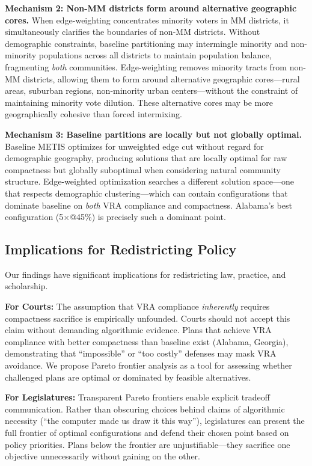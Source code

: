 \textbf{Mechanism 2: Non-MM districts form around alternative geographic cores.} When edge-weighting concentrates minority voters in MM districts, it simultaneously clarifies the boundaries of non-MM districts. Without demographic constraints, baseline partitioning may intermingle minority and non-minority populations across all districts to maintain population balance, fragmenting \emph{both} communities. Edge-weighting removes minority tracts from non-MM districts, allowing them to form around alternative geographic cores---rural areas, suburban regions, non-minority urban centers---without the constraint of maintaining minority vote dilution. These alternative cores may be more geographically cohesive than forced intermixing.

\textbf{Mechanism 3: Baseline partitions are locally but not globally optimal.} Baseline METIS optimizes for unweighted edge cut without regard for demographic geography, producing solutions that are locally optimal for raw compactness but globally suboptimal when considering natural community structure. Edge-weighted optimization searches a different solution space---one that respects demographic clustering---which can contain configurations that dominate baseline on \emph{both} VRA compliance and compactness. Alabama's best configuration (5$\times$@45\%) is precisely such a dominant point.

\subsection{Implications for Redistricting Policy}

Our findings have significant implications for redistricting law, practice, and scholarship.

\textbf{For Courts:} The assumption that VRA compliance \emph{inherently} requires compactness sacrifice is empirically unfounded. Courts should not accept this claim without demanding algorithmic evidence. Plans that achieve VRA compliance with better compactness than baseline exist (Alabama, Georgia), demonstrating that ``impossible'' or ``too costly'' defenses may mask VRA avoidance. We propose Pareto frontier analysis as a tool for assessing whether challenged plans are optimal or dominated by feasible alternatives.

\textbf{For Legislatures:} Transparent Pareto frontiers enable explicit tradeoff communication. Rather than obscuring choices behind claims of algorithmic necessity (``the computer made us draw it this way''), legislatures can present the full frontier of optimal configurations and defend their chosen point based on policy priorities. Plans below the frontier are unjustifiable---they sacrifice one objective unnecessarily without gaining on the other.

